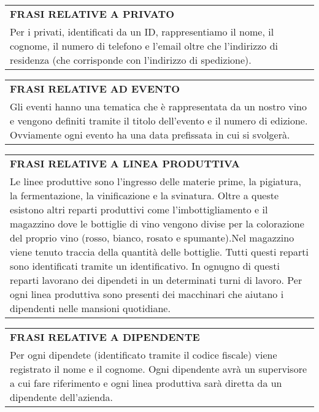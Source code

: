 \begin{center}
	\vspace{0.5cm}
	
	\begin{tabular}{P{16cm}}
		\toprule
		 \textbf {\large {FRASI RELATIVE A PRIVATO}} \\
		Per i privati, identificati da un ID, rappresentiamo il nome, il cognome, il numero di telefono e l'email oltre che l'indirizzo di residenza (che corrisponde con l'indirizzo di spedizione).\\
		\bottomrule
	\end{tabular}
	
	\vspace{0.5cm}
	
	\begin{tabular}{P{16cm}}
		\toprule
		 \textbf {\large {FRASI RELATIVE AD EVENTO}} \\
		Gli eventi hanno una tematica che è rappresentata da un nostro vino e vengono definiti tramite il titolo dell'evento e il numero di edizione. Ovviamente ogni evento ha una data prefissata in cui si svolgerà.\\
		\bottomrule
	\end{tabular}
	
	\vspace{0.5cm}
		
	\begin{tabular}{P{16cm}}
		\toprule
		 \textbf {\large {FRASI RELATIVE A LINEA PRODUTTIVA}} \\
		Le linee produttive sono l'ingresso delle materie prime, la pigiatura, la fermentazione, la vinificazione e la svinatura. Oltre a queste esistono altri reparti produttivi come l'imbottigliamento e il magazzino dove le bottiglie di vino vengono divise per la colorazione del proprio vino (rosso, bianco, rosato e spumante).Nel magazzino viene tenuto traccia della quantità delle bottiglie. Tutti questi reparti sono identificati tramite un identificativo. In ognugno di questi reparti lavorano dei dipendeti in un determinati turni di lavoro. Per ogni linea produttiva sono presenti dei macchinari che aiutano i dipendenti nelle mansioni quotidiane.\\
		\bottomrule
	\end{tabular}
	
	\vspace{0.5cm}
	
	\begin{tabular}{P{16cm}}
		\toprule
		 \textbf {\large {FRASI RELATIVE A DIPENDENTE}} \\
		Per ogni dipendete (identificato tramite il codice fiscale) viene registrato il nome e il cognome. Ogni dipendente avrà un supervisore a cui fare riferimento e ogni linea produttiva sarà diretta da un dipendente dell'azienda.\\
		\bottomrule
	\end{tabular}
	

\end{center}
